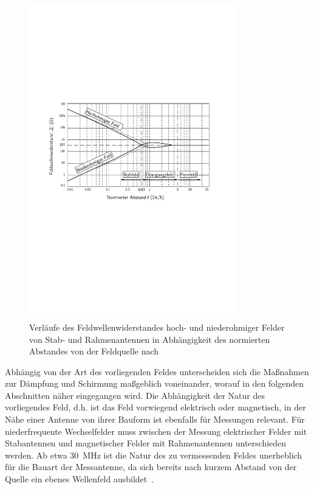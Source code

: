 \begin{figure}[ht]
    \centering
    \includegraphics[page=1, width=0.8\textwidth, trim = 1.3cm 8.5cm 1.5cm 7cm, clip]{Abbildungen/Kapitel2/Feldwellenwiderstand.pdf}
    \caption[Verläufe des Feldwellenwiderstandes hoch- und niederohmiger Felder von Stab- und Rahmenantennen in Abhängigkeit des normierten Abstandes von der Feldquelle]{Verläufe des Feldwellenwiderstandes hoch- und niederohmiger Felder von Stab- und Rahmenantennen in Abhängigkeit des normierten Abstandes von der Feldquelle nach~\cite{EMV}}
    \label{fig:2_Feldwellenwiderstand}
\end{figure}


Abhängig von der Art des vorliegenden Feldes unterscheiden sich die Maßnahmen zur Dämpfung und Schirmung maßgeblich voneinander, worauf in den folgenden Abschnitten näher eingegangen wird. Die Abhängigkeit der Natur des vorliegendes Feld, d.h. ist das Feld vorwiegend elektrisch oder magnetisch, in der Nähe einer Antenne von ihrer Bauform ist ebenfalls für Messungen relevant. Für niederfrequente Wechselfelder muss zwischen der Messung elektrischer Felder mit Stabantennen und magnetischer Felder mit Rahmenantennen unterschieden werden. Ab etwa \SI{30}{\mega\hertz} ist die Natur des zu vermessenden Feldes unerheblich für die Bauart der Messantenne, da sich bereits nach kurzem Abstand von der Quelle ein ebenes Wellenfeld ausbildet~\cite{Design_of_shielded_enclosures}.



